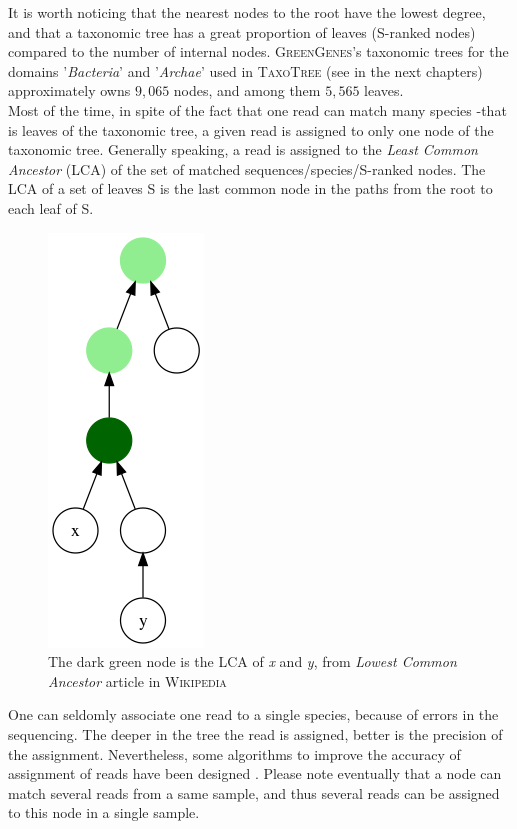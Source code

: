 \documentclass{report}
\begin{document}
It is worth noticing that the nearest nodes to the root have the lowest degree, and that a taxonomic tree has a great proportion of leaves (S-ranked nodes) compared to the number of internal nodes. \textsc{GreenGenes}'s taxonomic trees for the domains '\emph{Bacteria}' and '\emph{Archae}' used in \textsc{TaxoTree} (see in the next chapters) approximately owns $9,065$ nodes, and among them $5,565$ leaves.\\

Most of the time, in spite of the fact that one read can match many species -that is leaves of the taxonomic tree, a given read is assigned to only one node of the taxonomic tree. Generally speaking, a read is assigned to the \emph{Least Common Ancestor} (\textsc{LCA}) \cite{Tarjan} of the set of matched sequences/species/S-ranked nodes. The \textsc{LCA} of a set of leaves S is the last common node in the paths from the root to each leaf of S.

\begin{figure}[H]
\centering
\includegraphics[scale=0.35]{illustrations/Lowest_common_ancestor.png}
\caption{The dark green node is the LCA of \emph{x} and \emph{y}, from \emph{Lowest Common Ancestor} article in \textsc{Wikipedia}}
\end{figure}

One can seldomly associate one read to a single species, because of errors in the sequencing. The deeper in the tree the read is assigned, better is the precision of the assignment. Nevertheless, some algorithms to improve the accuracy of assignment of reads have been designed \cite{Tango1} \cite{Tango3}. Please note eventually that a node can match several reads from a same sample, and thus several reads can be assigned to this node in a single sample.
\end{document}
